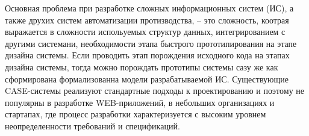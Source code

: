 \documentclass[conference]{IEEEtran} \IEEEoverridecommandlockouts
\begin{document}
Основная проблема при разработке сложных информационных систем (ИС), а также друхих систем автоматизации протизводства, -- это сложность, коотрая выражается в сложности испольуемых структур данных, интегрированием с другими системани, необходимости этапа быстрого прототипирования на этапе дизайна системы. Если проводить этап порождения исходного кода на этапах дизайна системы, тогда можно порождать прототипы системы сазу же как сформирована формализованна модели разрабатываемой ИС. Существующие CASE-системы реализуют стандартные подходы к проектированию и поэтому не популярны в разработке WEB-приложений, в небольших организациях и стартапах, где процесс разработки характеризуется с высоким уровнем неопределенности требований и спецификаций. 
\end{document}
